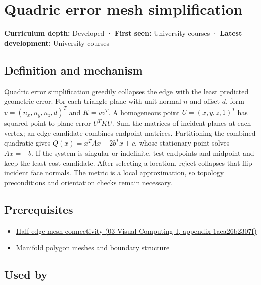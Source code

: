\hypertarget{appendix-1dd4ad54ca57}{}
\section{Quadric error mesh simplification}\label{appendix-1dd4ad54ca57-quadric-error-mesh-simplification}

\textbf{Curriculum depth:} Developed · \textbf{First seen:} University courses · \textbf{Latest development:} University courses

\subsection{Definition and mechanism}\label{appendix-1dd4ad54ca57-definition-and-mechanism}

Quadric error simplification greedily collapses the edge with the least predicted geometric error. For each triangle plane with unit normal \(n\) and offset \(d\), form \(v=(n_x,n_y,n_z,d)^T\) and \(K=vv^T\). A homogeneous point \(U=(x,y,z,1)^T\) has squared point-to-plane error \(U^TKU\). Sum the matrices of incident planes at each vertex; an edge candidate combines endpoint matrices. Partitioning the combined quadratic gives \(Q(x)=x^TAx+2b^Tx+c\), whose stationary point solves \(Ax=-b\). If the system is singular or indefinite, test endpoints and midpoint and keep the least-cost candidate. After selecting a location, reject collapses that flip incident face normals. The metric is a local approximation, so topology preconditions and orientation checks remain necessary.

\subsection{Prerequisites}\label{appendix-1dd4ad54ca57-prerequisites}

\begin{itemize}
\tightlist
\item
  \href{../03-Visual-Computing-I/main.pdf\#nameddest=appendix-1aea26b2307f}{Half-edge mesh connectivity (03-Visual-Computing-I, appendix-1aea26b2307f)}
\item
  \hyperref[appendix-fab348609369]{Manifold polygon meshes and boundary structure}
\end{itemize}

\subsection{Used by}\label{appendix-1dd4ad54ca57-used-by}

